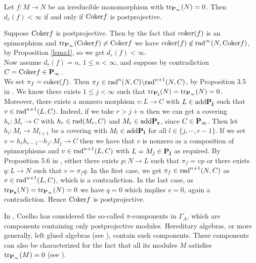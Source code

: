 \begin{thm}
\label{grauengana}
Let $f:M \rightarrow N$ be an irreducible monomorphism with ${\rm tr}_{{\bf P_{\infty}}}(N)=0$. Then $d_r(f)<{\infty}$ if and only if ${\rm Coker}f $ is  postprojective. \label{propmono}
\end{thm}

\begin{pf}
Suppose ${\rm Coker}f$ is postprojective. Then by the fact that ${\rm coker}(f)$ is an epimorphism and ${\rm tr}_{\bf P_{\infty}}({\rm Coker}f) \neq {\rm Coker}f$ we have ${\rm coker}(f) \not\in {\rm rad}^{\infty}(N,{\rm Coker}f)$, by Proposition \ref{lema1}, so we get $d_r(f)<{\infty}$.\\
Now assume $d_r(f)=n$, $1 \leq n < {\infty}$, and suppose by contradiction $C ={\rm Coker}f \in {\bf P_{\infty}}$.\\ 
We set $\pi_f={\rm coker}(f)$. Then $\pi_f \in {\rm rad}^n(N,C ) \backslash {\rm rad}^{n+1}(N,C)$, by Proposition 3.5 in \cite{chaio}. We know there exists $1 \leq j < {\infty}$ such that ${\rm tr}_{\bf P_{j}}(N) = {\rm tr}_{\bf P_{\infty}}(N)=0$. Moreover, there exists a nonzero morphism $v:L \rightarrow C$ with $L \in {\rm add}{\bf P_j}$ such that $v \in {\rm rad}^{n+1}(L,C)$. Indeed, if we take $r>j+n$ then we can get a covering $h_r:M_r \rightarrow C$ with $h_r \in {\rm rad}(M_r, C)$ and $M_r \in {\rm add}{\bf P_r}$, since $C \in {\bf P_{\infty}}$. Then let $h_l:M_l \rightarrow M_{l+1}$ be a covering with $M_l \in {\rm add}{\bf P_l}$ for all $l \in \{ j, \cdots ,r-1 \}$. If we set $v=h_rh_{r-1} \cdots h_j:M_j \rightarrow C$ then we have that $v$ is nonzero as a composition of epimorphisms and $v \in {\rm rad}^{n+1}(L,C)$ with $L=M_j \in {\bf P_j}$ as required.  By Proposition 5.6 in \cite{auslanderbook}, either there exists $p:N \rightarrow L$ such that $\pi_f=vp$ or there exists $q:L \rightarrow N$ such that $v=\pi_fq$. In the first case, we get $\pi_f \in {\rm rad}^{n+1}(N,C)$ as $v \in {\rm rad}^{n+1}(L,C)$, which is a contradiction. In the last case, as ${\rm tr}_{\bf P_{k}}(N) = {\rm tr}_{\bf P_{\infty}}(N)=0$ we have $q=0$ which implies $v=0$, again a contradiction. Hence ${\rm Coker}f$ is postprojective. 
\end{pf}

In \cite{coelho2}, Coelho has considered the so-called $\pi$-components in $\Gamma_A$, which are components containing only postprojective modules. Hereditary algebras, or more generally, left glued algebras (see \cite{assemcoelho}), contain such components. These components can also be characterized for the fact that all its modules $M$ satisfies ${\rm tr}_{\bf P_{\infty}}(M)=0$ (see \cite{coelho2}). 

